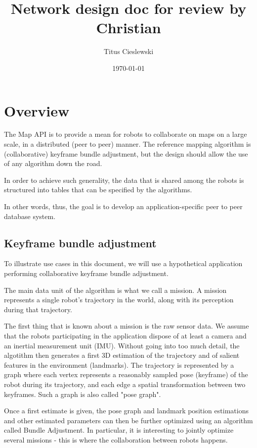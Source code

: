 \documentclass{article}
\title{Network design doc for review by Christian}
\author{Titus Cieslewski}
\date{\today}
\begin{document}
\maketitle

\section{Overview}

The Map API is to provide a mean for robots to collaborate on maps on a large
scale, in a distributed (peer to peer) manner. The reference mapping algorithm
is (collaborative) keyframe bundle adjustment, but the design should allow the 
use of any algorithm down the road.

In order to achieve such generality, the data that is shared among the robots is
structured into tables that can be specified by the algorithms.

In other words, thus, the goal is to develop an application-specific peer to
peer database system.

\subsection{Keyframe bundle adjustment}

To illustrate use cases in this document, we will use a hypothetical application
performing collaborative keyframe bundle adjustment. 

The main data unit of the algorithm is what we call a mission. A mission
represents a single robot's trajectory in the world, along with its perception
during that trajectory.

The first thing that is known about a mission is the raw sensor data. We assume
that the robots participating in the application dispose of at least a camera
and an inertial measurement unit (IMU). Without going into too much detail, the
algotithm then generates a first 3D estimation of the trajectory and of salient
features in the environment (landmarks). The trajectory is represented by a
graph where each vertex represents a reasonably sampled pose (keyframe) of the
robot during its trajectory, and each edge a spatial transformation between two 
keyframes. Such a graph is also called "pose graph".

Once a first estimate is given, the pose graph and landmark position estimations
and other estimated parameters can then be further optimized using an algorithm
called Bundle Adjustment. In particular, it is interesting to jointly optimize
several missions - this is where the collaboration between robots happens.
\end{document}
